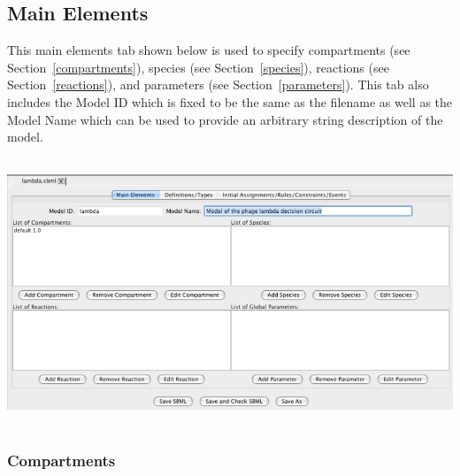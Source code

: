 \documentclass[titlepage,11pt]{article}
\begin{document}
\subsection{\label{MainElem}Main Elements}

\noindent
This main elements tab shown below is used to specify 
compartments (see Section~\ref{compartments}), 
species (see Section~\ref{species}), 
reactions (see Section~\ref{reactions}), and
parameters (see Section~\ref{parameters}).
This tab also includes the Model ID which is fixed to be the same as
the filename as well as the Model Name which can be used to provide an
arbitrary string description of the model.
\begin{center}
\includegraphics[height=80mm]{screenshots/mainElem}
\end{center}

\subsubsection{\label{compartments}Compartments}
\end{document}
